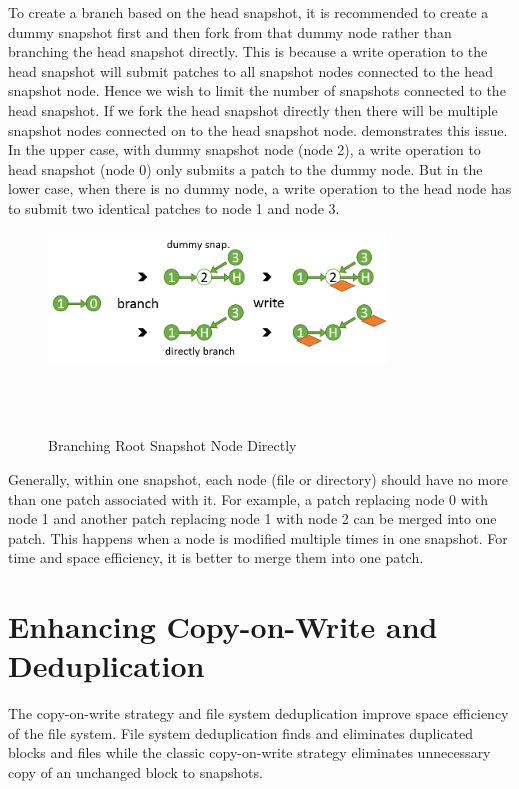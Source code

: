     To create a branch based on the head snapshot, it is recommended to create a dummy snapshot first and then fork from that dummy node rather than branching the head snapshot directly. This is because a write operation to the head snapshot will submit patches to all snapshot nodes connected to the head snapshot node. Hence we wish to limit the number of snapshots connected to the head snapshot. If we fork the head snapshot directly then there will be multiple snapshot nodes connected on to the head snapshot node.  demonstrates this issue. In the upper case, with dummy snapshot node (node 2), a write operation to head snapshot (node 0) only submits a patch to the dummy node. But in the lower case, when there is no dummy node, a write operation to the head node has to submit two identical patches to node 1 and node 3.

\begin{figure}[t]
\centering
\includegraphics[width=0.8\textwidth]{Chapter-4/figs/fig16.png}
\caption{Branching Root Snapshot Node Directly}
~\\
~\\
\label{fig:dummy_node}
\end{figure}

	Generally, within one snapshot, each node (file or directory) should have no more than one patch associated with it. For example, a patch replacing node 0 with node 1 and another patch replacing node 1 with node 2 can be merged into one patch. This happens when a node is modified multiple times in one snapshot. For time and space efficiency, it is better to merge them into one patch.
	
\section{Enhancing Copy-on-Write and Deduplication}

	The copy-on-write strategy and file system deduplication improve space efficiency of the file system. File system deduplication finds and eliminates duplicated blocks and files while the classic copy-on-write strategy eliminates unnecessary copy of an unchanged block to snapshots.

